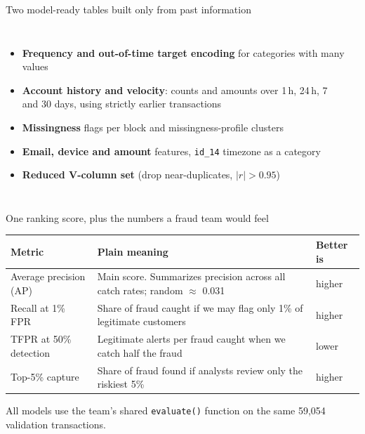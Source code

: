 \documentclass[aspectratio=169,10pt]{beamer}
\begin{document}
\begin{frame}{Two model-ready tables built only from past information}
\begin{columns}[T]
\small
\begin{itemize}\setlength{\itemsep}{2pt}
\item \textbf{Frequency and out-of-time target encoding} for categories with many values
\item \textbf{Account history and velocity}: counts and amounts over 1\,h, 24\,h, 7 and 30 days, using strictly earlier transactions
\item \textbf{Missingness} flags per block and missingness-profile clusters
\item \textbf{Email, device and amount} features, \texttt{id\_14} timezone as a category
\item \textbf{Reduced V-column set} (drop near-duplicates, $|r| > 0.95$)
\end{itemize}
\\[0.25cm]
\end{columns}
\end{frame}

\begin{frame}{One ranking score, plus the numbers a fraud team would feel}
\vspace{0.15cm}
\renewcommand{\arraystretch}{1.2}\small
\begin{tabularx}{\linewidth}{@{}B{4.0cm}Lp{2.0cm}@{}}
\toprule
Metric & Plain meaning & Better is \\
\midrule
Average precision (AP) & Main score. Summarizes precision across all catch rates; random $\approx$ 0.031 & higher \\
Recall at 1\% FPR & Share of fraud caught if we may flag only 1\% of legitimate customers & higher \\
TFPR at 50\% detection & Legitimate alerts per fraud caught when we catch half the fraud & lower \\
Top-5\% capture & Share of fraud found if analysts review only the riskiest 5\% & higher \\
\bottomrule
\end{tabularx}
\vspace{0.15cm}

\small All models use the team's shared \texttt{evaluate()} function on the same 59,054 validation transactions.
\end{frame}
\end{document}

